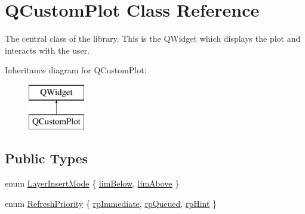 \hypertarget{class_q_custom_plot}{}\section{Q\+Custom\+Plot Class Reference}
\label{class_q_custom_plot}


The central class of the library. This is the Q\+Widget which displays the plot and interacts with the user.  


Inheritance diagram for Q\+Custom\+Plot\+:\begin{figure}[H]
\begin{center}
\leavevmode
\includegraphics[height=2.000000cm]{class_q_custom_plot}
\end{center}
\end{figure}
\subsection*{Public Types}
\begin{DoxyCompactItemize}
\item 
enum \mbox{\hyperlink{class_q_custom_plot_a75a8afbe6ef333b1f3d47abb25b9add7}{Layer\+Insert\+Mode}} \{ \mbox{\hyperlink{class_q_custom_plot_a75a8afbe6ef333b1f3d47abb25b9add7aee39cf650cd24e68552da0b697ce4a93}{lim\+Below}}, 
\mbox{\hyperlink{class_q_custom_plot_a75a8afbe6ef333b1f3d47abb25b9add7a062b0b7825650b432a713c0df6742d41}{lim\+Above}}
 \}
\item 
enum \mbox{\hyperlink{class_q_custom_plot_a45d61392d13042e712a956d27762aa39}{Refresh\+Priority}} \{ \mbox{\hyperlink{class_q_custom_plot_a45d61392d13042e712a956d27762aa39a0d4831572370d871f2b7cb88806bac59}{rp\+Immediate}}, 
\mbox{\hyperlink{class_q_custom_plot_a45d61392d13042e712a956d27762aa39aaaae083a19bc668597bf0f86e000f798}{rp\+Queued}}, 
\mbox{\hyperlink{class_q_custom_plot_a45d61392d13042e712a956d27762aa39adfa1f2387617168d9299f4c8ad15b332}{rp\+Hint}}
 \}
\end{DoxyCompactItemize}
